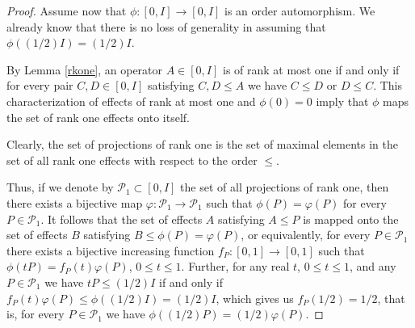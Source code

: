 \documentclass{article}
\begin{document}
\begin{proof}
Assume now that $\phi : [0,I] \to [0,I]$ is an order automorphism.
We already know that there is no loss of generality in assuming that $\phi ((1/2)I) = (1/2)I$. 

By Lemma \ref{rkone}, an operator $A \in [0,I]$ is of rank at most one if and only if
for every pair $C,D \in [0,I]$ satisfying $C,D \le A$ we have $C\le D$ or $D \le C$. This characterization of effects of rank at most one and $\phi(0) = 0$ imply that $\phi$ maps the set of rank one effects onto itself.

Clearly, the set of projections of rank one is the set of maximal elements in the set of all rank one effects with respect to the order $\le$.

Thus, if we denote by $\mathcal{P}_1 \subset [0,I]$ the set of all projections of rank one, then there exists a bijective map $\varphi : \mathcal{P}_1 \to \mathcal{P}_1$ such that $\phi (P) = \varphi (P)$ for every $P \in \mathcal{P}_1$. It follows that the set of effects $A$ satisfying $A \le P$ is mapped onto the set of 
effects $B$ satisfying $B \le \phi(P) = \varphi (P)$, or equivalently, for every $P \in \mathcal{P}_1$ there exists a 
bijective increasing function $f_P : [0,1] \to [0,1]$ such that $\phi (tP) = f_P (t) \varphi (P)$, $0 \le t \le 1$. 
Further, for any real $t$, $0 \le t \le 1$, and any $P \in \mathcal{P}_1$ we have $tP \le (1/2)I$ if and only if $f_P (t) \varphi(P) \le \phi ((1/2)I)= (1/2)I$, which gives us $f_P(1/2) = 1/2$, that is, 
for every $P \in \mathcal{P}_1$ we have $\phi ((1/2)P) = (1/2)\varphi (P)$. 


\end{proof}
\end{document}
